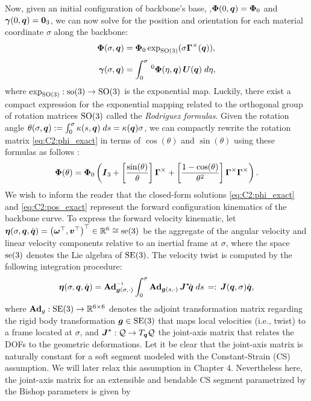 Now, given an initial configuration of backbone's base, \ie,$\boldsymbol{\Phi}(0,\boldsymbol{q}) = \boldsymbol{\Phi}_0$ and $ {\boldsymbol{\gamma}}(0,{\boldsymbol{q}}) = \boldsymbol{0}_3$, we can now solve for the position and orientation for each material coordinate $\sigma$ along the backbone:
%
\begin{align}
\boldsymbol{\Phi}(\sigma,\boldsymbol{q}) & = \boldsymbol{\Phi}_0\exp_{\textup{\textrm{SO}}(3)}(\sigma \boldsymbol{\Gamma}^\times(\boldsymbol{q})), \label{eq:C2:phi_exact} \\[0.35em]
{\boldsymbol{\gamma}}(\sigma,\boldsymbol{q}) & = \int_0^\sigma\,^0\boldsymbol{\Phi}(\eta,\boldsymbol{q})\, \boldsymbol{U}(\boldsymbol{q}) \; d\eta,
\label{eq:C2:pos_exact}
\end{align}
%
where $\exp_{\textup{\textrm{SO}}(3)}: \textup{\textrm{so}}(3) \to \textup{\textrm{SO}}(3)$ is the exponential map. Luckily, there exist a compact expression for the exponential mapping related to the orthogonal group of rotation matrices $\textup{\textrm{SO}}(3)$ called the \emph{Rodriguez formulas}. Given the rotation angle $\theta(\sigma,{\boldsymbol{q}}) := \int_0^\sigma \kappa(s,{\boldsymbol{q}}) \; ds = \kappa({\boldsymbol{q}}) \sigma$, we can compactly rewrite the rotation matrix \eqref{eq:C2:phi_exact} in terms of $\cos(\theta)$ and $\sin(\theta)$ using these formulas as follows \cite{Lynch2017}:
%
\begin{equation}
{\boldsymbol{\Phi}}(\theta) = {\boldsymbol{\Phi}}_0 \left( \boldsymbol{I}_3 + \left[ \frac{\sin(\theta)}{\theta} \right]  {\boldsymbol{\Gamma}}^{\times} + \left[ \frac{1-\cos(\theta)}{\theta^2} \right]  {\boldsymbol{\Gamma}}^{\times} {\boldsymbol{\Gamma}}^{\times} \right).
\label{eq:C2:phi_rodr}
\end{equation}
%
We wish to inform the reader that the closed-form solutions \eqref{eq:C2:phi_exact} and \eqref{eq:C2:pos_exact} represent the forward configuration kinematics of the backbone curve. To express the forward velocity kinematic, let
${\boldsymbol{\eta}}(\sigma,{\boldsymbol{q}},{\dot{\boldsymbol{q}}}) = \left( \boldsymbol{\omega}^\top, \boldsymbol{v}^\top \right)^\top \in \mathbb{R}^6 \cong \textup{\textrm{se}}(3)$
 be the aggregate of the angular velocity and linear velocity components relative to an inertial frame at $\sigma$, where the space $\textup{\textrm{se}}(3)$ denotes the Lie algebra of $\textup{\textrm{SE}}(3)$. The velocity twist is computed by the following integration procedure:
%
\begin{align}
 \etaB(\sigma,\q,\dq) = \Ad_{\mat{g}(\sigma,\cdot)}\inv \int_0^\sigma \Ad_{\mat{g}(s,\cdot)}\, \JB^\star\! \dq\;ds
 \,=:\, \JB(\q,\sigma) \dq, \label{eq:C2:vel_cont}
\end{align}
%
where $\textbf{Ad}_g: \textup{\textrm{SE}}(3) \to \mathbb{R}^{6\times 6}$ denotes the adjoint transformation matrix regarding the rigid body transformation ${\boldsymbol{g}} \in \textup{\textrm{SE}}(3)$ that maps local velocities (i.e., twist) to a frame located at $\sigma$, and ${\boldsymbol{J}}^\star:\mathcal{Q} \to T_{{\boldsymbol{q}}}\mathcal{Q}$ the joint-axis matrix that relates the DOFs to the geometric deformations. Let it be clear that the joint-axis matrix is naturally constant for a soft segment modeled with the Constant-Strain (CS) assumption. We will later relax this assumption in Chapter 4. Nevertheless here, the joint-axis matrix for an extensible and bendable CS segment parametrized by the Bishop parameters is given by

